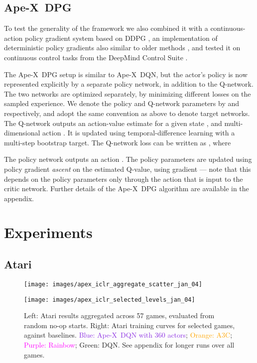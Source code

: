 \documentclass{article} \PassOptionsToPackage{usenames,dvipsnames}{xcolor}
\def\apex{Ape-X}
\def\smallcaption#1{\caption{\small #1}\vspace{-0.4cm}}
\begin{document}
\subsection{\apex\ DPG}

To test the generality of the framework we also combined it with a continuous-action policy gradient system based on DDPG \citep{ddpg}, an implementation of deterministic policy gradients \cite{dpg} also similar to older methods \citep{adhdp,acd}, and tested it on continuous control tasks from the DeepMind Control Suite \citep{tassa2018suite}.

The  \apex\ DPG setup is similar to \apex\ DQN, but the actor's policy is now represented explicitly by a separate policy network, in addition to the Q-network. The two networks are optimized separately, by minimizing different losses on the sampled experience. We denote the policy and Q-network parameters by  and  respectively, and adopt the same convention as above to denote target networks. The Q-network outputs an action-value estimate  for a given state , and multi-dimensional action . It is updated using temporal-difference learning with a multi-step bootstrap target. The Q-network loss can be written as , where


The policy network outputs an action . The policy parameters are updated using policy gradient \emph{ascent} on the estimated Q-value, using gradient  --- note that this depends on the policy parameters  only through the action  that is input to the critic network. Further details of the \apex\ DPG algorithm are available in the appendix.

\section{Experiments}

\subsection{Atari}
\begin{figure}
\begin{minipage}[t]{0.425\textwidth}
    \texttt{[image: images/apex\_iclr\_aggregate\_scatter\_jan\_04]}
\end{minipage}
\begin{minipage}[t]{0.575\textwidth}
    \texttt{[image: images/apex\_iclr\_selected\_levels\_jan\_04]}
\end{minipage}
    \smallcaption{Left: Atari results aggregated across 57 games, evaluated from random no-op starts. Right: Atari training curves for selected games, against baselines. \textcolor{BlueViolet}{Blue: \apex\ DQN with 360 actors}; \textcolor{Orange}{Orange: A3C}; \textcolor{Fuchsia}{Purple: Rainbow}; \textcolor{OliveGreen}{Green: DQN}. See appendix for longer runs over all games.}
    \label{fig:atari_aggregated_results}

\end{figure}
\end{document}
